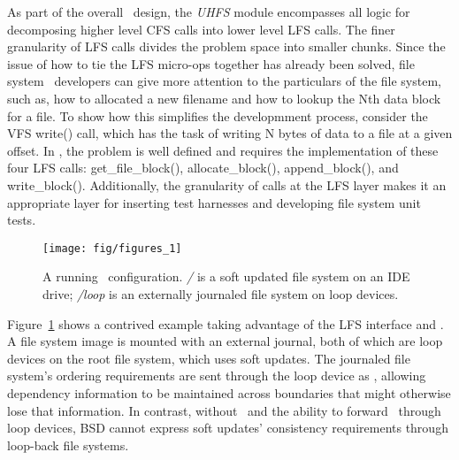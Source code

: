 As part of the overall \Kudos\ design, the \emph{UHFS} module encompasses all
logic for decomposing higher level CFS calls into lower level LFS calls. The
finer granularity of LFS calls divides the problem space into smaller chunks.
Since the issue of how to tie the LFS micro-ops together has already been
solved, file system \module\ developers can give more attention to the
particulars of the file system, such as, how to allocated a new filename and
how to lookup the Nth data block for a file. To show how this simplifies the
developmment process, consider the VFS write() call, which has the task of
writing N bytes of data to a file at a given offset. In \Kudos, the problem is
well defined and requires the implementation of these four LFS calls:
get\_file\_block(), allocate\_block(), append\_block(), and write\_block().
Additionally, the granularity of calls at the LFS layer makes it an appropriate
layer for inserting test harnesses and developing file system unit tests.

\begin{figure}[tb]
  \centering
  \texttt{[image: fig/figures\_1]}
  \caption{A running \Kudos\ configuration. {\it/} is a soft updated
    file system on an IDE drive; {\it/loop} is an externally journaled
    file system on loop devices.}
  \label{fig:kfs-graph}
\end{figure}

Figure~\ref{fig:kfs-graph} shows a contrived example taking advantage of the LFS
interface and \chdescs. A file system image is mounted with an external journal,
both of which are loop devices on the root file system, which uses soft updates.
The journaled file system's ordering requirements are sent through the loop
device as \chdescs, allowing dependency information to be maintained across
boundaries that might otherwise lose that information. In contrast, without
\chdescs\ and the ability to forward \chdescs\ through loop devices, BSD cannot
express soft updates' consistency requirements through loop-back file systems.
